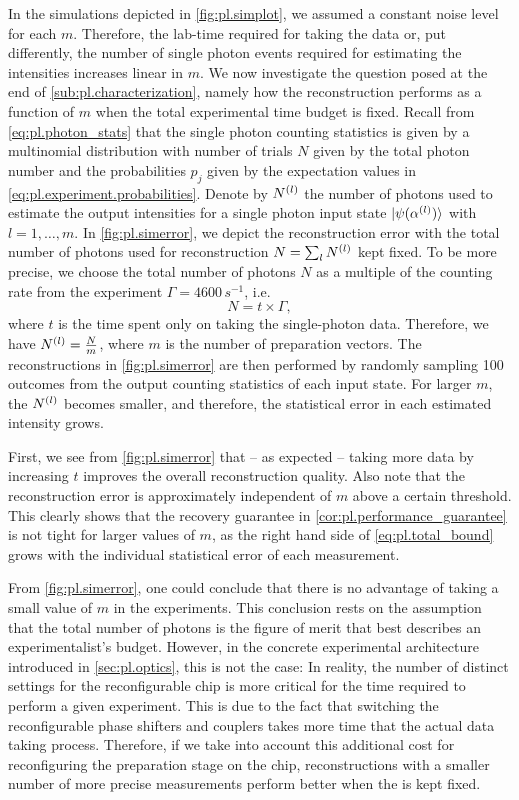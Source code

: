In the simulations depicted in \cref{fig:pl.simplot}, we assumed a constant noise level for each $m$.
Therefore, the lab-time required for taking the data or, put differently, the number of single photon events required for estimating the intensities increases linear in $m$.
We now investigate the question posed at the end of \cref{sub:pl.characterization}, namely how the reconstruction performs as a function of $m$ when the total experimental time budget is fixed.
Recall from \cref{eq:pl.photon_stats} that the single photon counting statistics is given by a multinomial distribution with number of trials $N$ given by the total photon number and the probabilities $p_j$ given by the expectation values in \cref{eq:pl.experiment.probabilities}.
Denote by $N^{(l)}$ the number of photons used to estimate the output intensities for a single photon input state $\ket{\psi(\alpha\ind{l})}$ with $l=1,\ldots,m$.
In \cref{fig:pl.simerror}, we depict the reconstruction error with the total number of photons used for reconstruction $N = \sum_l N^{(l)}$ kept fixed.
To be more precise, we choose the total number of photons $N$ as a multiple of the counting rate from the experiment $\Gamma = 4600\,s^{-1}$, i.e.
\[
  N = t \times \Gamma,
  \label{eq:pl.counts_from_time}
\]
where $t$ is the time spent only on taking the single-photon data.
Therefore, we have $N^{(l)} = \frac{N}{m}$, where $m$ is the number of preparation vectors.
The reconstructions in \cref{fig:pl.simerror} are then performed by randomly sampling 100 outcomes from the output counting statistics of each input state.
For larger $m$, the $N^{(l)}$ becomes smaller, and therefore, the statistical error in each estimated intensity grows.

First, we see from \cref{fig:pl.simerror} that -- as expected -- taking more data by increasing $t$ improves the overall reconstruction quality.
Also note that the reconstruction error is approximately independent of $m$ above a certain threshold.
This clearly shows that the recovery guarantee in \cref{cor:pl.performance_guarantee} is not tight for larger values of $m$, as the right hand side of \cref{eq:pl.total_bound} grows with the individual statistical error of each measurement.

From \cref{fig:pl.simerror}, one could conclude that there is no advantage of taking a small value of $m$ in the experiments.
This conclusion rests on the assumption that the total number of photons is the figure of merit that best describes an experimentalist's budget.
However, in the concrete experimental architecture introduced in \cref{sec:pl.optics}, this is not the case:
In reality, the number of distinct settings for the reconfigurable chip is more critical for the time required to perform a given experiment.
This is due to the fact that switching the reconfigurable phase shifters and couplers takes more time that the actual data taking process.
Therefore, if we take into account this additional cost for reconfiguring the preparation stage on the chip, reconstructions with a smaller number of more precise measurements perform better when the  is kept fixed.




